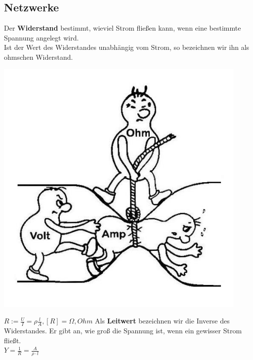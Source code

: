 %
%
%
%
%

					\subsection{Netzwerke}
					\label{chap:Style}



					\beginip
					Der \textbf{Widerstand} bestimmt, wieviel Strom fließen kann, wenn eine bestimmte Spannung angelegt wird. \\
					Ist der Wert des Widerstandes unabhängig vom Strom, so bezeichnen wir ihn als ohmschen Widerstand.
					\begin{center}
						\includegraphics[scale=0.25]{img/widerstand.png}
					\end{center}
					\formulaBegin
					$ R :=  \frac{U}{I} =  \rho  \frac{l}{A},   {[R]} = \Omega, Ohm $
					\formulaEnd
					Als \textbf{Leitwert} bezeichnen wir die Inverse des Widerstandes. Er gibt an, wie groß die Spannung ist, wenn ein gewisser Strom fließt. \\
					\formulaBegin
					$ Y = \frac{1}{R} = \frac{A}{\rho \cdot l} $
					\formulaEnd
					\iend




